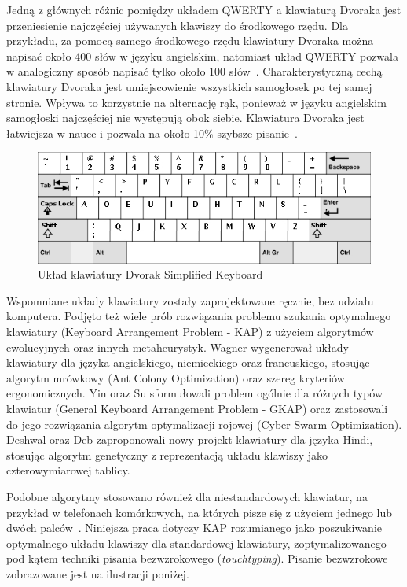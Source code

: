 \documentclass{xmgr}
\begin{document}
Jedną z głównych różnic pomiędzy układem QWERTY a klawiaturą Dvoraka jest przeniesienie najczęściej używanych klawiszy do środkowego rzędu. Dla przykładu, za pomocą samego środkowego rzędu klawiatury Dvoraka można napisać około 400 słów w języku angielskim, natomiast układ QWERTY pozwala w analogiczny sposób napisać tylko około 100 słów~\cite{Call:2005:CME}. Charakterystyczną cechą klawiatury Dvoraka jest umiejscowienie wszystkich samogłosek po tej samej stronie. Wpływa to korzystnie na alternację rąk, ponieważ w języku angielskim samogłoski najczęściej nie występują obok siebie. Klawiatura Dvoraka jest łatwiejsza w nauce i pozwala na około 10\% szybsze pisanie~\cite{Norman:1988:DOET}.

\begin{figure}[!tbh]
\centering
\includegraphics[width=.8\hsize]{fig/dvorak}
\caption{Układ klawiatury Dvorak Simplified Keyboard}
\end{figure}

Wspomniane układy klawiatury zostały zaprojektowane ręcznie, bez udziału komputera. Podjęto też wiele prób rozwiązania problemu szukania optymalnego klawiatury (Keyboard Arrangement Problem - KAP) z użyciem algorytmów ewolucyjnych oraz innych metaheurystyk. Wagner \cite{Eggers2003672} wygenerował układy klawiatury dla języka angielskiego, niemieckiego oraz francuskiego, stosując algorytm mrówkowy (Ant Colony Optimization) oraz szereg kryteriów ergonomicznych. Yin oraz Su \cite{Yin201143} sformułowali problem ogólnie dla różnych typów klawiatur (General Keyboard Arrangement Problem - GKAP) oraz zastosowali do jego rozwiązania algorytm optymalizacji rojowej (Cyber Swarm Optimization). Deshwal oraz Deb \cite{Hindi} zaproponowali nowy projekt klawiatury dla języka Hindi, stosując algorytm genetyczny z reprezentacją układu klawiszy jako czterowymiarowej tablicy.

Podobne algorytmy stosowano również dla niestandardowych klawiatur, na przykład w telefonach komórkowych, na których pisze się z użyciem jednego lub dwóch palców~\cite{Li2006695}. Niniejsza praca dotyczy KAP rozumianego jako poszukiwanie optymalnego układu klawiszy dla standardowej klawiatury, zoptymalizowanego pod kątem techniki pisania bezwzrokowego (\emph{touchtyping}). Pisanie bezwzrokowe zobrazowane jest na ilustracji poniżej.
\end{document}
